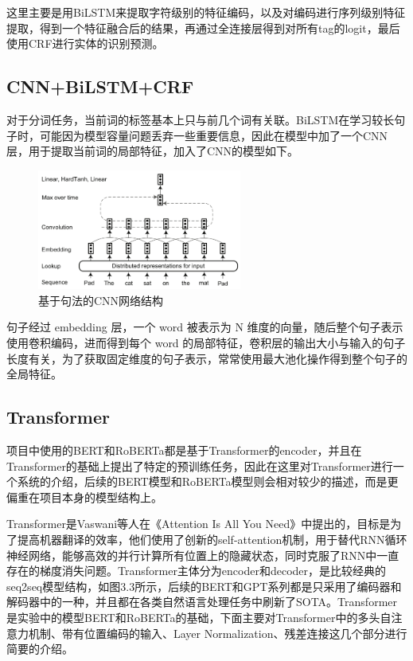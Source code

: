 \documentclass[a4paper, 12pt]{article}
\begin{document}
这里主要是用BiLSTM来提取字符级别的特征编码，以及对编码进行序列级别特征提取，得到一个特征融合后的结果，再通过全连接层得到对所有tag的logit，最后使用CRF进行实体的识别预测。


\subsection{CNN+BiLSTM+CRF} %
\label{sub:cnn}
对于分词任务，当前词的标签基本上只与前几个词有关联。BiLSTM在学习较长句子时，可能因为模型容量问题丢弃一些重要信息，因此在模型中加了一个CNN层，用于提取当前词的局部特征，加入了CNN的模型如下。

\begin{figure}[htbp]
    \centering
    \includegraphics[width=0.6\textwidth]{cnn}
    \caption{基于句法的CNN网络结构}
    \label{fig:encoder}
\end{figure}

句子经过 embedding 层，一个 word 被表示为 N 维度的向量，随后整个句子表示使用卷积编码，进而得到每个 word 的局部特征，卷积层的输出大小与输入的句子长度有关，为了获取固定维度的句子表示，常常使用最大池化操作得到整个句子的全局特征。


\subsection{Transformer}
\label{sub:transformer}
项目中使用的BERT和RoBERTa都是基于Transformer的encoder，并且在Transformer的基础上提出了特定的预训练任务，因此在这里对Transformer进行一个系统的介绍，后续的BERT模型和RoBERTa模型则会相对较少的描述，而是更偏重在项目本身的模型结构上。


Transformer是Vaswani等人在《Attention Is All You Need》中提出的，目标是为了提高机器翻译的效率，他们使用了创新的self-attention机制，用于替代RNN循环神经网络，能够高效的并行计算所有位置上的隐藏状态，同时克服了RNN中一直存在的梯度消失问题。Transformer主体分为encoder和decoder，是比较经典的seq2seq模型结构，如图3.3所示，后续的BERT和GPT系列都是只采用了编码器和解码器中的一种，并且都在各类自然语言处理任务中刷新了SOTA。Transformer是实验中的模型BERT和RoBERTa的基础，下面主要对Transformer中的多头自注意力机制、带有位置编码的输入、Layer Normalization、残差连接这几个部分进行简要的介绍。
\end{document}

